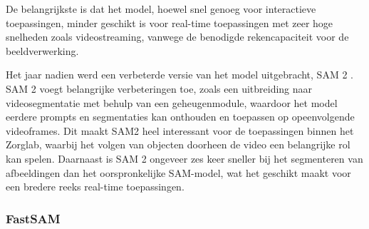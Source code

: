 De belangrijkste is dat het model, hoewel snel genoeg voor interactieve toepassingen, minder geschikt is voor real-time toepassingen met zeer hoge snelheden zoals videostreaming, vanwege de benodigde rekencapaciteit voor de beeldverwerking.
\newline \par
Het jaar nadien werd een verbeterde versie van het model uitgebracht, SAM 2 \autocite{Ravi2024}. 
SAM 2 voegt belangrijke verbeteringen toe, zoals een uitbreiding naar videosegmentatie met behulp van een geheugenmodule, waardoor het model eerdere prompts en segmentaties kan onthouden en toepassen op opeenvolgende videoframes. 
Dit maakt SAM2 heel interessant voor de toepassingen binnen het Zorglab, waarbij het volgen van objecten doorheen de video een belangrijke rol kan spelen.
Daarnaast is SAM 2 ongeveer zes keer sneller bij het segmenteren van afbeeldingen dan het oorspronkelijke SAM-model, wat het geschikt maakt voor een bredere reeks real-time toepassingen.

\subsubsection{FastSAM}

